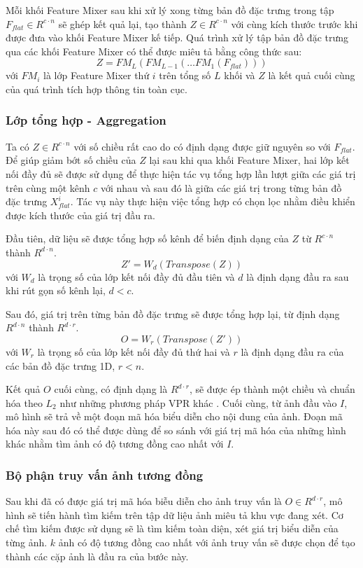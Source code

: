 Mỗi khối Feature Mixer sau khi xử lý xong từng bản đồ đặc trưng trong tập $F_{flat} \in R^{c \cdot n}$ sẽ ghép kết quả lại, tạo thành $Z \in R^{c \cdot n}$ với cùng kích thước trước khi được đưa vào khối Feature Mixer kế tiếp. Quá trình xử lý tập bản đồ đặc trưng qua các khối Feature Mixer có thể được miêu tả bằng công thức sau:
$$
  Z = FM_L(FM_{L-1}(\dots FM_1(F_{flat})))
$$
với $FM_i$ là lớp Feature Mixer thứ $i$ trên tổng số $L$ khối và $Z$ là kết quả cuối cùng của quá trình tích hợp thông tin toàn cục.

\subsubsection{Lớp tổng hợp - Aggregation}
Ta có $Z \in R^{c \cdot n}$ với số chiều rất cao do có định dạng được giữ nguyên so với $F_{flat}$. Để giúp giảm bớt số chiều của $Z$ lại sau khi qua khối Feature Mixer, hai lớp kết nối đầy đủ sẽ được sử dụng để thực hiện tác vụ tổng hợp lần lượt giữa các giá trị trên cùng một kênh $c$ với nhau và sau đó là giữa các giá trị trong từng bản đồ đặc trưng $X_{flat}^i$. Tác vụ này thực hiện việc tổng hợp có chọn lọc nhằm điều khiển được kích thước của giá trị đầu ra.

Đầu tiên, dữ liệu sẽ được tổng hợp số kênh để biến định dạng của $Z$ từ $R^{c \cdot n}$ thành $R^{d \cdot n}$.
$$
  Z' = W_d(Transpose(Z))
$$
với $W_d$ là trọng số của lớp kết nối đầy đủ đầu tiên và $d$ là định dạng đầu ra sau khi rút gọn số kênh lại, $d<c$.

Sau đó, giá trị trên từng bản đồ đặc trưng sẽ được tổng hợp lại, từ định dạng $R^{d \cdot n}$ thành $R^{d \cdot r}$.
$$
  O = W_r(Transpose(Z'))
$$
với $W_r$ là trọng số của lớp kết nối đầy đủ thứ hai và $r$ là định dạng đầu ra của các bản đồ đặc trưng 1D, $r<n$.

Kết quả $O$ cuối cùng, có định dạng là $R^{d \cdot r}$, sẽ được ép thành một chiều và chuẩn hóa theo $L_2$ như những phương pháp VPR khác \cite{arandjelovic2016netvlad,berton2022rethinking}. Cuối cùng, từ ảnh đầu vào $I$, mô hình sẽ trả về một đoạn mã hóa biểu diễn cho nội dung của ảnh. Đoạn mã hóa này sau đó có thể được dùng để so sánh với giá trị mã hóa của những hình khác nhằm tìm ảnh có độ tương đồng cao nhất với $I$.

\subsubsection{Bộ phận truy vấn ảnh tương đồng}
Sau khi đã có được giá trị mã hóa biễu diễn cho ảnh truy vấn là $O \in R^{d \cdot r}$, mô hình sẽ tiến hành tìm kiếm trên tập dữ liệu ảnh miêu tả khu vực đang xét. Cơ chế tìm kiếm được sử dụng sẽ là tìm kiếm toàn diện, xét giá trị biểu diễn của từng ảnh. $k$ ảnh có độ tương đồng cao nhất với ảnh truy vấn sẽ được chọn để tạo thành các cặp ảnh là đầu ra của bước này.

